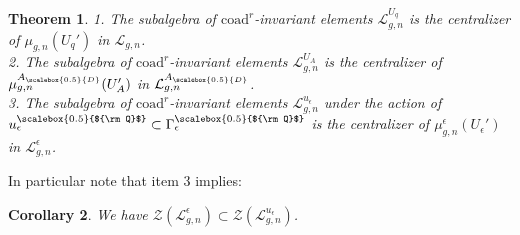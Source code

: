 \documentclass[11pt]{amsart}
\newtheorem{teo}{Theorem}[section]
\newtheorem{cor}[teo]{Corollary}
\newcommand{\e}{\epsilon}
\newcommand{\Ll}{\mathcal{L}}
\newcommand{\AD}{A_{\scalebox{0.5}{D}}}
\newcommand{\Q}{{\scalebox{0.5}{${\rm Q}$}}}
\begin{document}
\begin{teo}\label{centralizerMu}
1. The subalgebra of $\mathrm{coad}^r$-invariant elements $\mathcal{L}_{g,n}^{U_q}$ is the centralizer of $\mu_{g,n}(U_q')$ in $\mathcal{L}_{g,n}$.
\\2. The subalgebra of $\mathrm{coad}^r$-invariant elements $\mathcal{L}_{g,n}^{U_A}$ is the centralizer of $\mu_{g,n}^{\AD}(U_{A}')$ in $\mathcal{L}_{g,n}^{\AD}$.
\\3. The subalgebra of $\mathrm{coad}^r$-invariant elements $\mathcal{L}_{g,n}^{u_\e}$ under the action of $u_\e^\Q \subset \Gamma_\e^\Q$ is the centralizer of $\mu_{g,n}^{\e}(U_{\e}')$ in $\mathcal{L}_{g,n}^{\e}$.
\end{teo}
In particular note that item 3 implies:
\begin{cor} \label{ZinLue} We have $\mathcal{Z}(\mathcal{L}_{g,n}^\e) \subset \mathcal{Z}(\Ll_{g,n}^{u_\e})$.
\end{cor}
\end{document}
